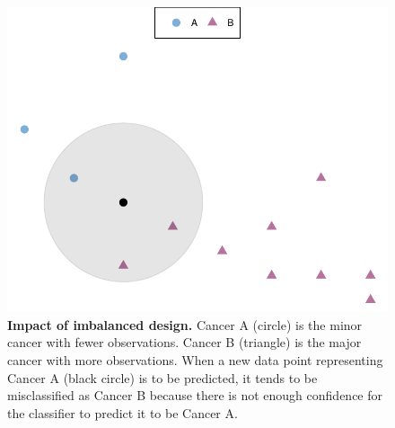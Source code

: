 \begin{figure}[h!]
    \centering
    \includegraphics[scale=1]{graphics/imbalanced.pdf}
    \caption{\textbf{Impact of imbalanced design.} Cancer A (circle) is the minor cancer with fewer observations. Cancer B (triangle) is the major cancer with more observations. When a new data point representing Cancer A (black circle) is to be predicted, it tends to be misclassified as Cancer B because there is not enough confidence for the classifier to predict it to be Cancer A.}
    \label{fig:imbalanced}
\end{figure}
